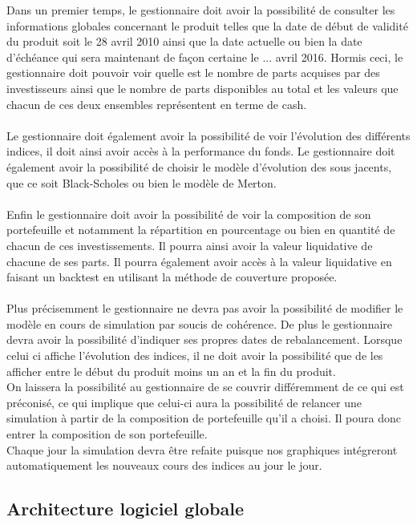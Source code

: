 \documentclass[french,12pt,a4paper]{article}
\begin{document}
Dans un premier temps, le gestionnaire doit avoir la possibilité de consulter les informations globales concernant le produit telles que la date de début de validité du produit soit le 28 avril  2010 ainsi que la date actuelle ou bien la date d'échéance qui sera maintenant de façon certaine le ... avril 2016. Hormis ceci, le gestionnaire doit pouvoir voir quelle est le nombre de parts acquises par des investisseurs ainsi que le nombre de parts disponibles au total et les valeurs que chacun de ces deux ensembles représentent en terme de cash.\\
\indent \\
\indent Le gestionnaire doit également avoir la possibilité de voir l'évolution des différents indices, il doit ainsi avoir accès à la performance du fonds.
Le gestionnaire doit également avoir la possibilité de choisir le modèle d'évolution des sous jacents, que ce soit Black-Scholes ou bien le modèle de Merton.\\
\indent \\
\indent Enfin le gestionnaire doit avoir la possibilité de voir la composition de son portefeuille et notamment la répartition en pourcentage ou bien en quantité de chacun de ces investissements. Il pourra ainsi avoir la valeur liquidative de chacune de ses parts. Il pourra également avoir accès à la valeur liquidative en faisant un backtest en utilisant la méthode de couverture proposée.\\
\indent \\
\indent Plus précisemment le gestionnaire ne devra pas avoir la possibilité de modifier le modèle en cours de simulation par soucis de cohérence. De plus le gestionnaire devra avoir la possibilité d'indiquer ses propres dates de rebalancement. Lorsque celui ci affiche l'évolution des indices, il ne doit avoir la possibilité que de les afficher entre le début du produit moins un an et la fin du produit.\\
On laissera la possibilité au gestionnaire de se couvrir différemment de ce qui est préconisé, ce qui implique que celui-ci aura la possibilité de relancer une simulation à partir de la composition de portefeuille qu'il a choisi. Il poura donc entrer la composition de son portefeuille.
\indent \\
\indent Chaque jour la simulation devra être refaite puisque nos graphiques intégreront automatiquement les nouveaux cours des indices au jour le jour.

\subsection{Architecture logiciel globale}
\end{document}
